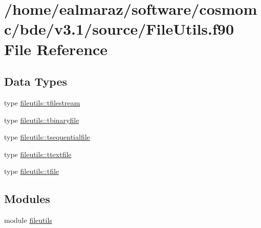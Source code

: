 \hypertarget{FileUtils_8f90}{}\section{/home/ealmaraz/software/cosmomc/bde/v3.1/source/\+File\+Utils.f90 File Reference}
\label{FileUtils_8f90}
\subsection*{Data Types}
\begin{DoxyCompactItemize}
\item 
type \mbox{\hyperlink{structfileutils_1_1tfilestream}{fileutils\+::tfilestream}}
\item 
type \mbox{\hyperlink{structfileutils_1_1tbinaryfile}{fileutils\+::tbinaryfile}}
\item 
type \mbox{\hyperlink{structfileutils_1_1tsequentialfile}{fileutils\+::tsequentialfile}}
\item 
type \mbox{\hyperlink{structfileutils_1_1ttextfile}{fileutils\+::ttextfile}}
\item 
type \mbox{\hyperlink{structfileutils_1_1tfile}{fileutils\+::tfile}}
\end{DoxyCompactItemize}
\subsection*{Modules}
\begin{DoxyCompactItemize}
\item 
module \mbox{\hyperlink{namespacefileutils}{fileutils}}
\end{DoxyCompactItemize}
